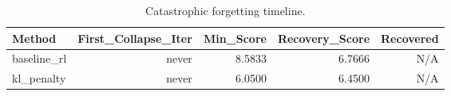 \begin{table}[htbp]
\centering
\caption{Catastrophic forgetting timeline.}
\label{tab:forgetting}
\begin{tabular}{lrrrr}
\toprule
\textbf{Method} & \textbf{First_Collapse_Iter} & \textbf{Min_Score} & \textbf{Recovery_Score} & \textbf{Recovered} \\
\midrule
baseline_rl & never & 8.5833 & 6.7666 & N/A \\
kl_penalty & never & 6.0500 & 6.4500 & N/A \\
\bottomrule
\end{tabular}
\end{table}